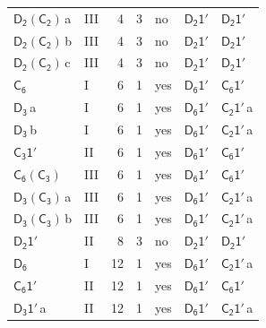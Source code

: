\documentclass[10pt,a4paper]{article}
\numberwithin{equation}{section}
\newcommand{\grp}[1]{\mathsf{#1}}
\newcommand{\clsletter}[1]{\,{\scriptsize\color{black!55}#1}}
\begin{document}
{\begin{longtable}{@{}llrrlll@{}}
\href{D2-C2.pdf}{$\grp{D_{2}}(\grp{C_{2}})$}\clsletter{a} & III & 4 & 3 & no & \href{D2-1p.pdf}{$\grp{D_{2}1'}$} & \href{D2-1p.pdf}{$\grp{D_{2}1'}$}\\
\href{D2-C2.pdf}{$\grp{D_{2}}(\grp{C_{2}})$}\clsletter{b} & III & 4 & 3 & no & \href{D2-1p.pdf}{$\grp{D_{2}1'}$} & \href{D2-1p.pdf}{$\grp{D_{2}1'}$}\\
\href{D2-C2.pdf}{$\grp{D_{2}}(\grp{C_{2}})$}\clsletter{c} & III & 4 & 3 & no & \href{D2-1p.pdf}{$\grp{D_{2}1'}$} & \href{D2-1p.pdf}{$\grp{D_{2}1'}$}\\
\href{../../../rotation/data/pdf/C6.pdf}{$\grp{C_{6}}$} & I & 6 & 1 & yes & \href{D6-1p.pdf}{$\grp{D_{6}1'}$} & \href{C6-1p.pdf}{$\grp{C_{6}1'}$}\\
\href{../../../rotation/data/pdf/D3.pdf}{$\grp{D_{3}}$}\clsletter{a} & I & 6 & 1 & yes & \href{D6-1p.pdf}{$\grp{D_{6}1'}$} & \href{C2-1p.pdf}{$\grp{C_{2}1'}$}\clsletter{a}\\
\href{../../../rotation/data/pdf/D3.pdf}{$\grp{D_{3}}$}\clsletter{b} & I & 6 & 1 & yes & \href{D6-1p.pdf}{$\grp{D_{6}1'}$} & \href{C2-1p.pdf}{$\grp{C_{2}1'}$}\clsletter{a}\\
\href{C3-1p.pdf}{$\grp{C_{3}1'}$} & II & 6 & 1 & yes & \href{D6-1p.pdf}{$\grp{D_{6}1'}$} & \href{C6-1p.pdf}{$\grp{C_{6}1'}$}\\
\href{C6-C3.pdf}{$\grp{C_{6}}(\grp{C_{3}})$} & III & 6 & 1 & yes & \href{D6-1p.pdf}{$\grp{D_{6}1'}$} & \href{C6-1p.pdf}{$\grp{C_{6}1'}$}\\
\href{D3-C3.pdf}{$\grp{D_{3}}(\grp{C_{3}})$}\clsletter{a} & III & 6 & 1 & yes & \href{D6-1p.pdf}{$\grp{D_{6}1'}$} & \href{C2-1p.pdf}{$\grp{C_{2}1'}$}\clsletter{a}\\
\href{D3-C3.pdf}{$\grp{D_{3}}(\grp{C_{3}})$}\clsletter{b} & III & 6 & 1 & yes & \href{D6-1p.pdf}{$\grp{D_{6}1'}$} & \href{C2-1p.pdf}{$\grp{C_{2}1'}$}\clsletter{a}\\
\href{D2-1p.pdf}{$\grp{D_{2}1'}$} & II & 8 & 3 & no & \href{D2-1p.pdf}{$\grp{D_{2}1'}$} & \href{D2-1p.pdf}{$\grp{D_{2}1'}$}\\
\href{../../../rotation/data/pdf/D6.pdf}{$\grp{D_{6}}$} & I & 12 & 1 & yes & \href{D6-1p.pdf}{$\grp{D_{6}1'}$} & \href{C2-1p.pdf}{$\grp{C_{2}1'}$}\clsletter{a}\\
\href{C6-1p.pdf}{$\grp{C_{6}1'}$} & II & 12 & 1 & yes & \href{D6-1p.pdf}{$\grp{D_{6}1'}$} & \href{C6-1p.pdf}{$\grp{C_{6}1'}$}\\
\href{D3-1p.pdf}{$\grp{D_{3}1'}$}\clsletter{a} & II & 12 & 1 & yes & \href{D6-1p.pdf}{$\grp{D_{6}1'}$} & \href{C2-1p.pdf}{$\grp{C_{2}1'}$}\clsletter{a}\\

\end{longtable}}
\end{document}

